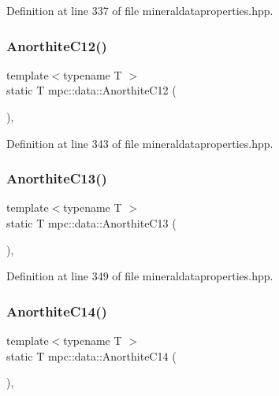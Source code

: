 Definition at line 337 of file mineraldataproperties.\+hpp.

\mbox{\label{namespacempc_1_1data_aee9fe50a9ff9cb28ca9ee38d306e1cf9}} 
\subsubsection{\texorpdfstring{Anorthite\+C12()}{AnorthiteC12()}}
{\footnotesize\ttfamily template$<$typename T $>$ \\
static T mpc\+::data\+::\+Anorthite\+C12 (\begin{DoxyParamCaption}{ }\end{DoxyParamCaption})\hspace{0.3cm}{\ttfamily [inline]}, {\ttfamily [static]}}



Definition at line 343 of file mineraldataproperties.\+hpp.

\mbox{\label{namespacempc_1_1data_a18a0c72b244e7853bc1f73c9dbf8a776}} 
\subsubsection{\texorpdfstring{Anorthite\+C13()}{AnorthiteC13()}}
{\footnotesize\ttfamily template$<$typename T $>$ \\
static T mpc\+::data\+::\+Anorthite\+C13 (\begin{DoxyParamCaption}{ }\end{DoxyParamCaption})\hspace{0.3cm}{\ttfamily [inline]}, {\ttfamily [static]}}



Definition at line 349 of file mineraldataproperties.\+hpp.

\mbox{\label{namespacempc_1_1data_a93d953b94e88a7998c13754d797834be}} 
\subsubsection{\texorpdfstring{Anorthite\+C14()}{AnorthiteC14()}}
{\footnotesize\ttfamily template$<$typename T $>$ \\
static T mpc\+::data\+::\+Anorthite\+C14 (\begin{DoxyParamCaption}{ }\end{DoxyParamCaption})\hspace{0.3cm}{\ttfamily [inline]}, {\ttfamily [static]}}



